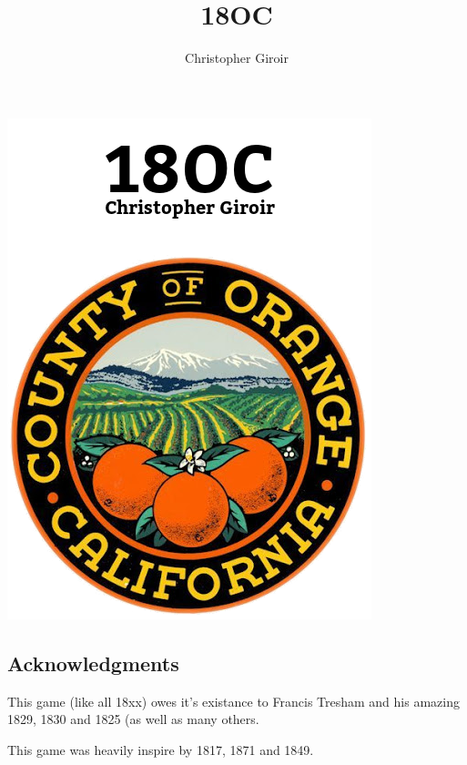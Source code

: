 \documentclass[letterpaper]{article}
\title{18OC}
\author{Christopher Giroir}
\begin{document}
\begin{titlepage}
  \begin{center}
    \vfill
    \includegraphics[width=400px]{18OC.png}
    \vfill
  \end{center}
\end{titlepage}

\newpage
\tableofcontents
\newpage

\begin{multicols}{2}
    \section{Acknowledgments}

    This game (like all 18xx) owes it's existance to Francis Tresham and his
    amazing 1829, 1830 and 1825 (as well as many others.

    This game was heavily inspire by 1817, 1871 and 1849.
\end{multicols}

\newpage
\end{document}
